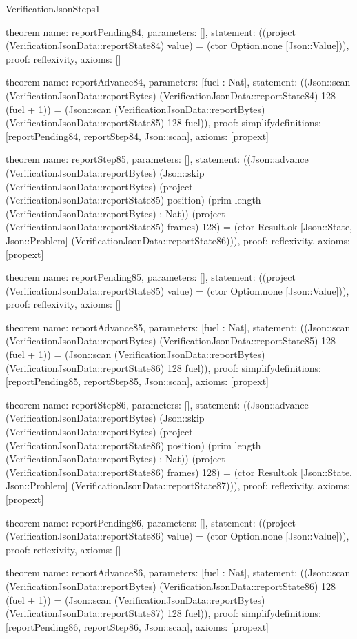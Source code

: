 \begin{lexlean}{VerificationJsonSteps1}
\begin{semanticmodule}
theorem{
  name: reportPending84,
  parameters: [],
  statement: ((project (VerificationJsonData::reportState84) value) = (ctor Option.none [Json::Value])),
  proof: reflexivity{},
  axioms: []
}

theorem{
  name: reportAdvance84,
  parameters: [fuel : Nat],
  statement: ((Json::scan (VerificationJsonData::reportBytes) (VerificationJsonData::reportState84) 128 (fuel + 1)) = (Json::scan (VerificationJsonData::reportBytes) (VerificationJsonData::reportState85) 128 fuel)),
  proof: simplify{definitions: [reportPending84, reportStep84, Json::scan]},
  axioms: [propext]
}

theorem{
  name: reportStep85,
  parameters: [],
  statement: ((Json::advance (VerificationJsonData::reportBytes) (Json::skip (VerificationJsonData::reportBytes) (project (VerificationJsonData::reportState85) position) (prim length (VerificationJsonData::reportBytes) : Nat)) (project (VerificationJsonData::reportState85) frames) 128) = (ctor Result.ok [Json::State, Json::Problem] (VerificationJsonData::reportState86))),
  proof: reflexivity{},
  axioms: [propext]
}

theorem{
  name: reportPending85,
  parameters: [],
  statement: ((project (VerificationJsonData::reportState85) value) = (ctor Option.none [Json::Value])),
  proof: reflexivity{},
  axioms: []
}

theorem{
  name: reportAdvance85,
  parameters: [fuel : Nat],
  statement: ((Json::scan (VerificationJsonData::reportBytes) (VerificationJsonData::reportState85) 128 (fuel + 1)) = (Json::scan (VerificationJsonData::reportBytes) (VerificationJsonData::reportState86) 128 fuel)),
  proof: simplify{definitions: [reportPending85, reportStep85, Json::scan]},
  axioms: [propext]
}

theorem{
  name: reportStep86,
  parameters: [],
  statement: ((Json::advance (VerificationJsonData::reportBytes) (Json::skip (VerificationJsonData::reportBytes) (project (VerificationJsonData::reportState86) position) (prim length (VerificationJsonData::reportBytes) : Nat)) (project (VerificationJsonData::reportState86) frames) 128) = (ctor Result.ok [Json::State, Json::Problem] (VerificationJsonData::reportState87))),
  proof: reflexivity{},
  axioms: [propext]
}

theorem{
  name: reportPending86,
  parameters: [],
  statement: ((project (VerificationJsonData::reportState86) value) = (ctor Option.none [Json::Value])),
  proof: reflexivity{},
  axioms: []
}

theorem{
  name: reportAdvance86,
  parameters: [fuel : Nat],
  statement: ((Json::scan (VerificationJsonData::reportBytes) (VerificationJsonData::reportState86) 128 (fuel + 1)) = (Json::scan (VerificationJsonData::reportBytes) (VerificationJsonData::reportState87) 128 fuel)),
  proof: simplify{definitions: [reportPending86, reportStep86, Json::scan]},
  axioms: [propext]
}


\end{semanticmodule}
\end{lexlean}
